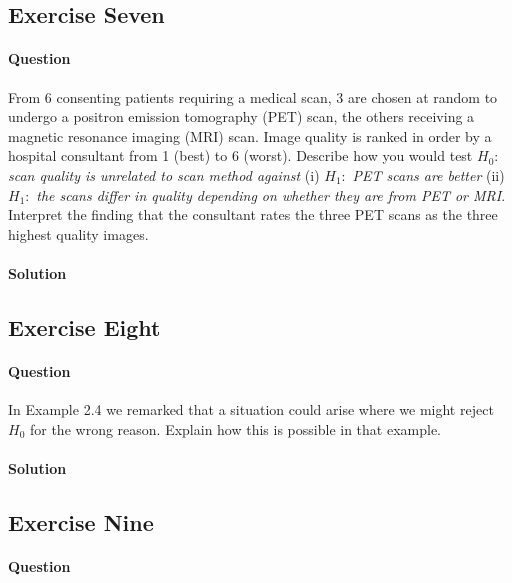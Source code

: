 \documentclass[]{article}
\let\oldparagraph\paragraph
\renewcommand{\paragraph}[1]{\oldparagraph{#1}\mbox{}}
\begin{document}
\subsection{Exercise Seven}\label{exercise-seven}

\paragraph{Question}\label{question-6}

From 6 consenting patients requiring a medical scan, 3 are chosen at
random to undergo a positron emission tomography (PET) scan, the others
receiving a magnetic resonance imaging (MRI) scan. Image quality is
ranked in order by a hospital consultant from 1 (best) to 6 (worst).
Describe how you would test \(H_0\): \emph{scan quality is unrelated to
scan method against} (i) \(H_1:\) \emph{PET scans are better} (ii)
\(H_1:\) \emph{the scans differ in quality depending on whether they are
from PET or MRI}. Interpret the finding that the consultant rates the
three PET scans as the three highest quality images.

\paragraph{Solution}\label{solution-6}

\subsection{Exercise Eight}\label{exercise-eight}

\paragraph{Question}\label{question-7}

In Example 2.4 we remarked that a situation could arise where we might
reject \(H_0\) for the wrong reason. Explain how this is possible in
that example.

\paragraph{Solution}\label{solution-7}

\subsection{Exercise Nine}\label{exercise-nine}

\paragraph{Question}\label{question-8}
\end{document}

